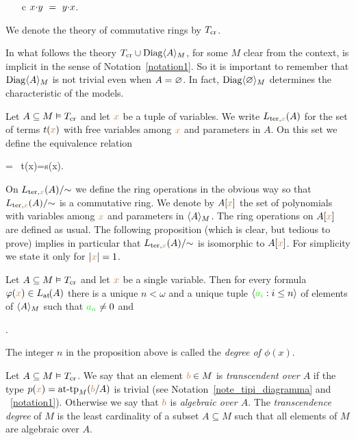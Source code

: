 \documentclass[creche.tex]{subfiles}
\begin{document}
\begin{itemize}
\item[c] $x\mdot y\ =\ y\mdot x$.
\end{itemize}
 
We denote the theory of commutative rings by \emph{$T_{\rm cr}$}.

In what follows the theory $T_{\rm cr}\cup\Diag\<A\>_M$, for some $M$ clear from the context, is implicit in the sense of Notation~\ref{notation1}. So it is important to remember that $\Diag\<A\>_M$ is not trivial even when $A=\0$. In fact, $\Diag\<\0\>_M$ determines the characteristic of the models.

Let  $A\subseteq M\models T_{\rm cr}$ and let ${\mr x}$ be a tuple of variables. We write $L_{{\rm ter},{\mr x}}(A)$ for the set of terms $t({\mr x})$ with free variables among ${\mr x}$ and parameters in $A$. On this set we define the equivalence relation

%
{=}%
{\proves \ t({\mr x})=s({\mr x}).}

On $L_{{\rm ter},{\mr x}}(A)/\mathord{\sim}$ we define the ring operations in the obvious way so that $L_{{\rm ter},{\mr x}}(A)/\mathord{\sim}$ is a commutative ring. We denote by $A[{\mr x}]$ the set of polynomials with variables among ${\mr x}$ and parameters in $\<A\>_M$. The ring operations on $A[{\mr x}]$ are defined as usual. The following proposition (which is clear, but tedious to prove) implies in particular that $L_{{\rm ter},{\mr x}}(A)/\mathord{\sim}$ is isomorphic to $A[{\mr x}]$. For simplicity we state it only for $|{\mr x}|=1$.

\begin{proposition}
\label{prop_formacanonicaterminiau}
Let  $A\subseteq M\models T_{\rm cr}$ and let ${\mr x}$ be a single variable. Then for every formula $\phi({\mr x})\in \atL(A)$ there is a unique $n<\omega$ and a unique tuple $\<{\gr a_i}:i\le n\>$ of elements of $\<A\>_M$ such that ${\gr a_n}\neq0$ and 

.\QED
\end{proposition}

The integer $n$ in the proposition above is called the \emph{degree of $\phi(x)$}.

\begin{definition} Let $A\subseteq M\models T_{\rm cr}$. We say that an element ${\mr b}\in M$ is \emph{transcendent over $A$\/} if the type $p({\mr x})=\attp_M({\mr b}/A)$ is trivial (see Notation~\ref{note_tipi_diagramma} and ~\ref{notation1}). Otherwise we say that ${\mr b}$ is \emph{algebraic over $A$}. The \emph{transcendence degree\/} of $M$ is the least cardinality of a subset $A\subseteq M$ such that all elements of $M$ are algebraic over $A$.\QED
\end{definition}  
\end{document}
